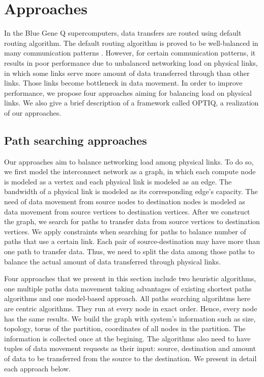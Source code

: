 \section{Approaches}
\label{sec:approach}

In the Blue Gene Q supercomputers, data transfers are routed using default routing algorithm. The default routing algorithm is proved to be well-balanced in many communication patterns \cite{Chen:BGQ}. However, for certain communication patterns, it results in poor performance due to unbalanced networking load on physical links, in which some links serve more amount of data transferred through than other links. Those links become bottleneck in data movement. In order to improve performance, we propose four approaches aiming for balancing load on physical links. We also give a brief description of a framework called OPTIQ, a realization of our approaches.

\subsection{Path searching approaches}
Our approaches aim to balance networking load among physical links. To do so, we first model the interconnect network as a graph, in which each compute node is modeled as a vertex and each physical link is modeled as an edge. The bandwidth of a physical link is modeled as its corresponding edge's capacity. The need of data movement from source nodes to destination nodes is modeled as data movement from source vertices to destination vertices. After we construct the graph, we search for paths to transfer data from source vertices to destination vertices. We apply constraints when searching for paths to balance number of paths that use a certain link. Each pair of source-destination may have more than one path to transfer data. Thus, we need to split the data among those paths to balance the actual amount of data transferred through physical links.

Four approaches that we present in this section include two heuristic algorithms, one multiple paths data movement taking advantages of existing shortest paths algorithms and one model-based approach. All paths searching algorihtms here are centric algorithms. They run at every node in exact order. Hence, every node has the same results. We build the graph with system's information such as size, topology, torus of the partition, coordinates of all nodes in the partition. The information is collected once at the begining. The algorithms also need to have tuples of data movement requests as their input: source, destination and amount of data to be transferred from the source to the destination. We present in detail each approach below.


